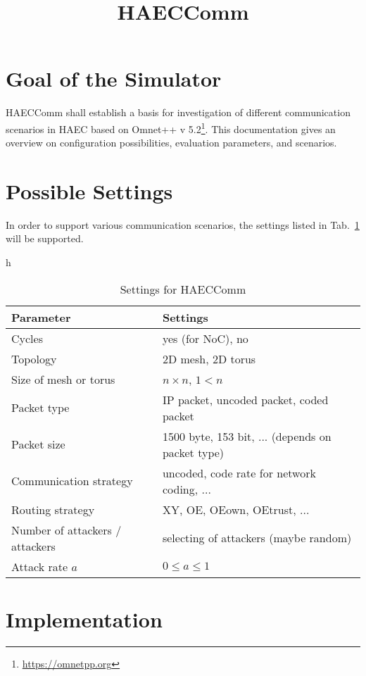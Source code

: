\documentclass[12pt]{article}
\begin{document}
\title{HAECComm}
\author{}
\maketitle

\section{Goal of the Simulator}
HAECComm shall establish a basis for investigation of different communication scenarios in HAEC based on Omnet++ v 5.2\footnote{\url{https://omnetpp.org}}. This documentation gives an overview on configuration possibilities, evaluation parameters, and scenarios.

\section{Possible Settings}
\label{sec:settings}

In order to support various communication scenarios, the settings listed in Tab.~\ref{tab_settings} will be supported. 

\begin{table}{h}
	\caption{\label{tab_settings}Settings for HAECComm}
  \begin{tabular}{|l|l|}

	\hline 
	Parameter&Settings  \\ 
	\hline \hline
	Cycles&yes (for NoC), no  \\ 
	\hline 
	Topology& 2D mesh, 2D torus \\ 
	\hline 
	Size of mesh or torus&$n \times n$, $1 < n$  \\ 
	\hline 
	Packet type&IP packet, uncoded packet, coded packet\\ 
	\hline 
	Packet size&1500 byte, 153 bit, ... (depends on packet type)  \\ 
	\hline 
	Communication strategy&uncoded, code rate for network coding, ...\\ 
	\hline 
	Routing strategy&XY, OE, OEown, OEtrust, ...  \\ 
	\hline 
	Number of attackers / attackers&selecting of attackers (maybe random)   \\ 
	\hline 
	Attack rate $a$&$0 \le a \le 1$  \\ 
	\hline 
  \end{tabular} 
\end{table}



\section{Implementation}
\end{document}
